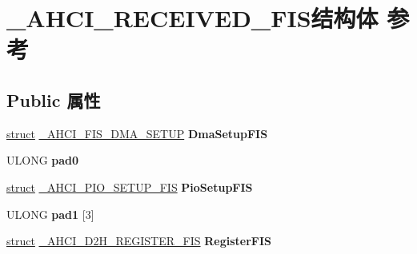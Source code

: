 \hypertarget{struct___a_h_c_i___r_e_c_e_i_v_e_d___f_i_s}{}\section{\+\_\+\+A\+H\+C\+I\+\_\+\+R\+E\+C\+E\+I\+V\+E\+D\+\_\+\+F\+I\+S结构体 参考}
\label{struct___a_h_c_i___r_e_c_e_i_v_e_d___f_i_s}
\subsection*{Public 属性}
\begin{DoxyCompactItemize}
\item 
\mbox{\label{struct___a_h_c_i___r_e_c_e_i_v_e_d___f_i_s_a2ef45e259d055e769518172fc2dd3d44}} 
\hyperlink{interfacestruct}{struct} \hyperlink{struct___a_h_c_i___f_i_s___d_m_a___s_e_t_u_p}{\+\_\+\+A\+H\+C\+I\+\_\+\+F\+I\+S\+\_\+\+D\+M\+A\+\_\+\+S\+E\+T\+UP} {\bfseries Dma\+Setup\+F\+IS}
\item 
\mbox{\label{struct___a_h_c_i___r_e_c_e_i_v_e_d___f_i_s_a0bd20b2f656c0e588e55b97ab0c9fb81}} 
U\+L\+O\+NG {\bfseries pad0}
\item 
\mbox{\label{struct___a_h_c_i___r_e_c_e_i_v_e_d___f_i_s_a10b8e72a5b0bb12223cab741283ff6f5}} 
\hyperlink{interfacestruct}{struct} \hyperlink{struct___a_h_c_i___p_i_o___s_e_t_u_p___f_i_s}{\+\_\+\+A\+H\+C\+I\+\_\+\+P\+I\+O\+\_\+\+S\+E\+T\+U\+P\+\_\+\+F\+IS} {\bfseries Pio\+Setup\+F\+IS}
\item 
\mbox{\label{struct___a_h_c_i___r_e_c_e_i_v_e_d___f_i_s_a28d6740ae36054fa3d1286953ebd8445}} 
U\+L\+O\+NG {\bfseries pad1} \mbox{[}3\mbox{]}
\item 
\mbox{\label{struct___a_h_c_i___r_e_c_e_i_v_e_d___f_i_s_aa20dd78684d0c68bbd19e6d4956b6bc7}} 
\hyperlink{interfacestruct}{struct} \hyperlink{struct___a_h_c_i___d2_h___r_e_g_i_s_t_e_r___f_i_s}{\+\_\+\+A\+H\+C\+I\+\_\+\+D2\+H\+\_\+\+R\+E\+G\+I\+S\+T\+E\+R\+\_\+\+F\+IS} {\bfseries Register\+F\+IS}
\item 
\mbox{\label{struct___a_h_c_i___r_e_c_e_i_v_e_d___f_i_s_ab5f5f1aaa1366bd8c1d0d41aff35404e}} 

\end{DoxyCompactItemize}
